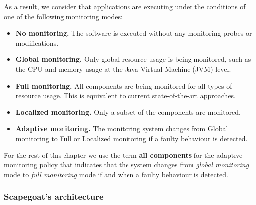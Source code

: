 As a result, we consider that applications are executing under the conditions of one of the following monitoring modes:
\begin{itemize}
\leftskip -.2in
	\item \textbf{No monitoring.} The software is executed without any monitoring probes or modifications.
	\item \textbf{Global monitoring.} Only global resource usage is being monitored, such as the CPU and memory usage at the Java Virtual Machine (JVM) level.
	\item \textbf{Full monitoring.} All components are being monitored for all types of resource usage. This is equivalent to current state-of-the-art approaches.
	\item \textbf{Localized monitoring.} Only a subset of the components are monitored.
	\item \textbf{Adaptive monitoring.} The monitoring system changes from Global monitoring to Full or Localized monitoring if a faulty behaviour is detected.
\end{itemize}
For the rest of this chapter we use the term \textbf{all components} for the adaptive monitoring policy that indicates that the system changes from \emph{global monitoring} mode to \emph{full monitoring} mode if and when a faulty behaviour is detected.



\subsubsection{Scapegoat's architecture}


